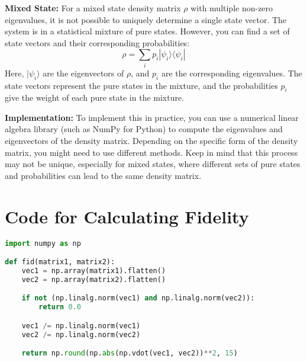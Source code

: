 \documentclass{article}
\begin{document}
\textbf{Mixed State:}
For a mixed state density matrix $\rho$ with multiple non-zero eigenvalues, it is not possible to uniquely determine a single state vector. The system is in a statistical mixture of pure states. However, you can find a set of state vectors and their corresponding probabilities:
\[ \rho = \sum_i p_i |\psi_i\rangle\langle\psi_i| \]
Here, $|\psi_i\rangle$ are the eigenvectors of $\rho$, and $p_i$ are the corresponding eigenvalues. The state vectors represent the pure states in the mixture, and the probabilities $p_i$ give the weight of each pure state in the mixture.

\textbf{Implementation:}
To implement this in practice, you can use a numerical linear algebra library (such as NumPy for Python) to compute the eigenvalues and eigenvectors of the density matrix. Depending on the specific form of the density matrix, you might need to use different methods.
Keep in mind that this process may not be unique, especially for mixed states, where different sets of pure states and probabilities can lead to the same density matrix.

\section{Code for Calculating Fidelity} %
\label{sec:Code for Calculating Fidelity}
\begin{lstlisting}[language=Python]
import numpy as np

def fid(matrix1, matrix2):
    vec1 = np.array(matrix1).flatten()
    vec2 = np.array(matrix2).flatten()

    if not (np.linalg.norm(vec1) and np.linalg.norm(vec2)):
        return 0.0

    vec1 /= np.linalg.norm(vec1)
    vec2 /= np.linalg.norm(vec2)

    return np.round(np.abs(np.vdot(vec1, vec2))**2, 15)
\end{lstlisting}
\end{document}
